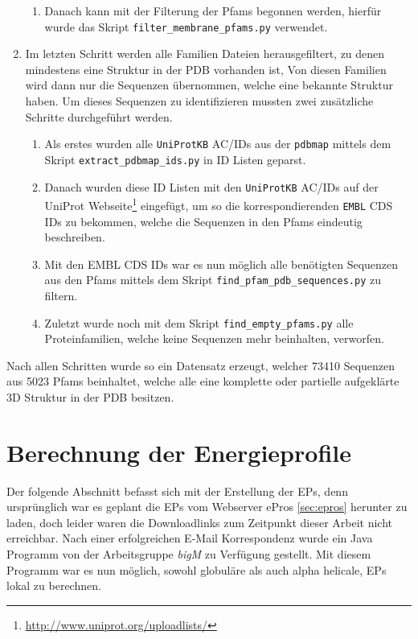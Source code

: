 \begin{enumerate}
\begin{enumerate}
        \item
        Danach kann mit der Filterung der \ac{Pfams} begonnen werden, hierfür wurde das Skript \texttt{filter\_membrane\_pfams.py} verwendet.
    \end{enumerate}
\item
    Im letzten Schritt werden alle Familien Dateien herausgefiltert, zu denen mindestens eine Struktur in der \ac{PDB} vorhanden ist, Von diesen Familien wird dann nur die Sequenzen übernommen, welche eine bekannte Struktur haben. Um dieses Sequenzen zu identifizieren mussten zwei zusätzliche Schritte durchgeführt werden.
    \begin{enumerate}
        \item
        Als erstes wurden alle \texttt{UniProtKB} AC/IDs aus der \texttt{pdbmap} mittels dem Skript \texttt{extract\_pdbmap\_ids.py} in ID Listen geparst. 
        \item
        Danach wurden diese ID Listen mit den \texttt{UniProtKB} AC/IDs auf der UniProt Webseite\footnote{\url{http://www.uniprot.org/uploadlists/}} eingefügt, um so die korrespondierenden \texttt{EMBL} CDS IDs zu bekommen, welche die Sequenzen in den Pfams eindeutig beschreiben.
        \item
        Mit den EMBL CDS IDs war es nun möglich alle benötigten Sequenzen aus den Pfams mittels dem Skript \texttt{find\-\_pfam\-\_pdb\-\_sequences.py} zu filtern.
        \item
        Zuletzt wurde noch mit dem Skript \texttt{find\-\_empty\-\_pfams.py} alle Proteinfamilien, welche keine Sequenzen mehr beinhalten, verworfen. 
    \end{enumerate}
\end{enumerate}

Nach allen Schritten wurde so ein Datensatz erzeugt, welcher 73410 Sequenzen aus 5023 \ac{Pfams} beinhaltet, welche alle eine komplette oder partielle aufgeklärte 3D Struktur in der \ac{PDB} besitzen.




\section{Berechnung der Energieprofile}
\label{sec:calc_ep}
Der folgende Abschnitt befasst sich mit der Erstellung der \ac{EP}s, denn ursprünglich war es geplant die \ac{EP}s vom Webserver ePros \ref{sec:epros} herunter zu laden, doch leider waren die Downloadlinks zum Zeitpunkt dieser Arbeit nicht erreichbar. Nach einer erfolgreichen E-Mail Korrespondenz wurde ein Java Programm von der Arbeitsgruppe \emph{bigM} zu Verfügung gestellt. Mit diesem Programm war es nun möglich, sowohl globuläre als auch alpha helicale, \ac{EP}s lokal zu berechnen. 

